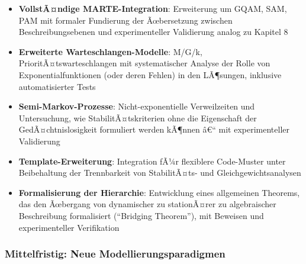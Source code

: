 ﻿\documentclass[a4paper,12pt]{scrreprt}
\theoremstyle{definition}
\begin{document}
\begin{itemize}
	\item[-] \textbf{VollstÃ¤ndige MARTE-Integration}: Erweiterung um GQAM, SAM, PAM mit formaler Fundierung der Ãœbersetzung zwischen Beschreibungsebenen und experimenteller Validierung analog zu Kapitel 8
	
	\item[-] \textbf{Erweiterte Warteschlangen-Modelle}: M/G/k, PrioritÃ¤tswarteschlangen mit systematischer Analyse der Rolle von Exponentialfunktionen (oder deren Fehlen) in den LÃ¶sungen, inklusive automatisierter Tests
	
	\item[-] \textbf{Semi-Markov-Prozesse}: Nicht-exponentielle Verweilzeiten und Untersuchung, wie StabilitÃ¤tskriterien ohne die Eigenschaft der GedÃ¤chtnislosigkeit formuliert werden kÃ¶nnen â€“ mit experimenteller Validierung
	
	\item[-] \textbf{Template-Erweiterung}: Integration fÃ¼r flexiblere Code-Muster unter Beibehaltung der Trennbarkeit von StabilitÃ¤ts- und Gleichgewichtsanalysen
	
	\item[-] \textbf{Formalisierung der Hierarchie}: Entwicklung eines allgemeinen Theorems, das den Ãœbergang von dynamischer zu stationÃ¤rer zu algebraischer Beschreibung formalisiert (``Bridging Theorem''), mit Beweisen und experimenteller Verifikation
\end{itemize}

\subsubsection{Mittelfristig: Neue Modellierungsparadigmen}
\end{document}
